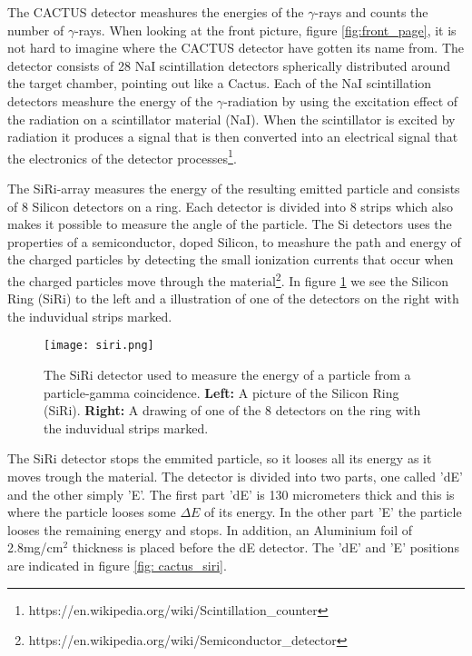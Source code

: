 \documentclass[11pt,a4wide]{article}
\begin{document}
The CACTUS detector meashures the energies of the $\gamma$-rays and counts the number of $\gamma$-rays. When looking at the front picture, figure \ref{fig:front_page}, it is not hard to imagine where the CACTUS detector have gotten its name from. The detector consists of 28 NaI scintillation detectors spherically distributed around the target chamber, pointing out like a Cactus. Each of the NaI scintillation detectors  meashure the energy of the $\gamma$-radiation by using the excitation effect of the radiation on a scintillator material (NaI). When the scintillator is excited by radiation it produces a signal that is then converted into an electrical signal that the electronics of the detector processes\footnote{https://en.wikipedia.org/wiki/Scintillation\_counter}. 

The SiRi-array measures the energy of the resulting emitted particle and consists of 8 Silicon detectors on a ring. Each detector is divided into 8 strips which also makes it possible to measure the angle of the particle. The Si detectors uses the properties of a semiconductor, doped Silicon, to meashure the path and energy of the charged particles by detecting the small ionization currents that occur when the charged particles move through the material\footnote{https://en.wikipedia.org/wiki/Semiconductor\_detector}. In figure \ref{fig: siri} we see the Silicon Ring (SiRi) to the left and a illustration of one of the detectors on the right with the induvidual strips marked.
\begin{figure}[htp]
\centering
\texttt{[image: siri.png]}
\caption{The SiRi detector used to measure the energy of a particle from a particle-gamma coincidence. \textbf{Left:} A picture of the Silicon Ring (SiRi). \textbf{Right:} A drawing of one of the 8 detectors on the ring with the induvidual strips marked.}
\label{fig: siri}
\end{figure}

The SiRi detector stops the emmited particle, so it looses all its energy as it moves trough the material. The detector is divided into two parts, one called 'dE' and the other simply 'E'. The first part 'dE' is 130 micrometers thick and this is where the particle looses some $\Delta E$ of its energy. In the other part 'E' the particle looses the remaining energy and stops. In addition, an Aluminium foil of 2.8mg/cm${}^2$ thickness is placed before the dE detector. The 'dE' and 'E' positions are indicated in figure \ref{fig: cactus_siri}.

\end{document}
